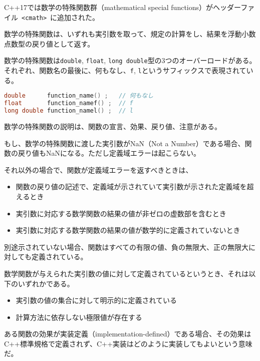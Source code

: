 %

C++17では数学の特殊関数群（mathematical special
functions）がヘッダーファイル~\lstinline!<cmath>!~に追加された。

数学の特殊関数は、いずれも実引数を取って、規定の計算をし、結果を浮動小数点数型の戻り値として返す。

数学の特殊関数は\lstinline!double!, \lstinline!float!,
\lstinline!long double!型の3つのオーバーロードがある。それぞれ、関数名の最後に、何もなし、\lstinline!f!,
\lstinline!l!というサフィックスで表現されている。

\begin{lstlisting}[language=C++]
double      function_name() ;   // 何もなし
float       function_namef() ;  // f
long double function_namel() ;  // l
\end{lstlisting}

数学の特殊関数の説明は、関数の宣言、効果、戻り値、注意がある。

もし、数学の特殊関数に渡した実引数がNaN（Not a
Number）である場合、関数の戻り値もNaNになる。ただし定義域エラーは起こらない。

それ以外の場合で、関数が定義域エラーを返すべきときは、
\begin{itemize}
\itemsep1pt\parskip0pt
\item
  関数の戻り値の記述で、定義域が示されていて実引数が示された定義域を超えるとき
\item
  実引数に対応する数学関数の結果の値が非ゼロの虚数部を含むとき
\item
  実引数に対応する数学関数の結果の値が数学的に定義されていないとき
\end{itemize}
別途示されていない場合、関数はすべての有限の値、負の無限大、正の無限大に対しても定義されている。

数学関数が与えられた実引数の値に対して定義されているというとき、それは以下のいずれかである。

\begin{itemize}
\itemsep1pt\parskip0pt
\item
  実引数の値の集合に対して明示的に定義されている
\item
  計算方法に依存しない極限値が存在する
\end{itemize}

ある関数の効果が実装定義（implementation-defined）である場合、その効果はC++標準規格で定義されず、C++実装はどのように実装してもよいという意味だ。

